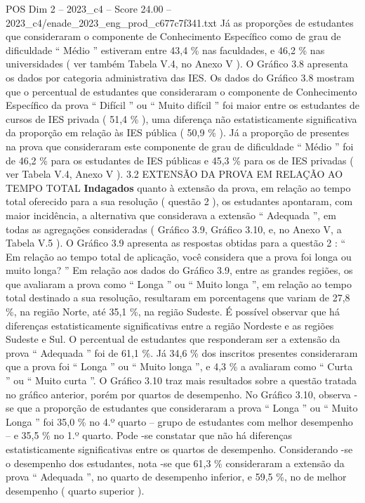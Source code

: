 \begin{textsample}{POS Dim 2 – 2023\_c4 – Score 24.00 – 2023\_c4/enade\_2023\_eng\_prod\_c677c7f341.txt}
Já as proporções de estudantes que consideraram o componente de Conhecimento Específico como de grau de dificuldade “ Médio ” estiveram entre 43,4 \% nas faculdades, e 46,2 \% nas universidades ( ver também Tabela V.4, no Anexo V ).
O Gráfico 3.8 apresenta os dados por categoria administrativa das IES.
Os dados do Gráfico 3.8 mostram que o percentual de estudantes que consideraram o componente de Conhecimento Específico da prova “ Difícil ” ou “ Muito difícil ” foi maior entre os estudantes de cursos de IES privada ( 51,4 \% ), uma diferença não estatisticamente significativa da proporção em relação às IES pública ( 50,9 \% ).
Já a proporção de presentes na prova que consideraram este componente de grau de dificuldade “ Médio ” foi de 46,2 \% para os estudantes de IES públicas e 45,3 \% para os de IES privadas ( ver Tabela V.4, Anexo V ). 3.2 EXTENSÃO DA PROVA EM RELAÇÃO AO TEMPO TOTAL \textbf{Indagados} quanto à extensão da prova, em relação ao tempo total oferecido para a sua resolução ( questão 2 ), os estudantes apontaram, com maior incidência, a alternativa que considerava a extensão “ Adequada ”, em todas as agregações consideradas ( Gráfico 3.9, Gráfico 3.10, e, no Anexo V, a Tabela V.5 ).
O Gráfico 3.9 apresenta as respostas obtidas para a questão 2 : “ Em relação ao tempo total de aplicação, você considera que a prova foi longa ou muito longa? ” Em relação aos dados do Gráfico 3.9, entre as grandes regiões, os que avaliaram a prova como “ Longa ” ou “ Muito longa ”, em relação ao tempo total destinado a sua resolução, resultaram em porcentagens que variam de 27,8 \%, na região Norte, até 35,1 \%, na região Sudeste.
É possível observar que há diferenças estatisticamente significativas entre a região Nordeste e as regiões Sudeste e Sul.
O percentual de estudantes que responderam ser a extensão da prova “ Adequada ” foi de 61,1 \%.
Já 34,6 \% dos inscritos presentes consideraram que a prova foi “ Longa ” ou “ Muito longa ”, e 4,3 \% a avaliaram como “ Curta ” ou “ Muito curta ”.
O Gráfico 3.10 traz mais resultados sobre a questão tratada no gráfico anterior, porém por quartos de desempenho.
No Gráfico 3.10, observa -se que a proporção de estudantes que consideraram a prova “ Longa ” ou “ Muito Longa ” foi 35,0 \% no 4.º quarto – grupo de estudantes com melhor desempenho – e 35,5 \% no 1.º quarto.
Pode -se constatar que não há diferenças estatisticamente significativas entre os quartos de desempenho.
Considerando -se o desempenho dos estudantes, nota -se que 61,3 \% consideraram a extensão da prova “ Adequada ”, no quarto de desempenho inferior, e 59,5 \%, no de melhor desempenho ( quarto superior ).

\end{textsample}
